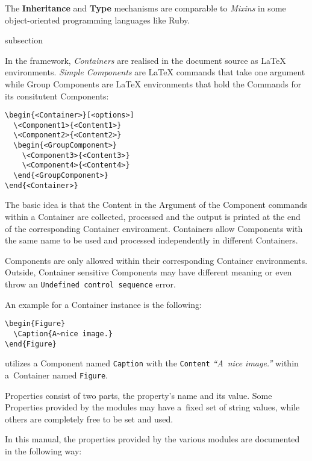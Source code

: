 The \textbf{Inheritance} and \textbf{Type} mechanisms are comparable
to \textit{Mixins} in some object-oriented programming languages like
Ruby.


\begin{Heading}{subsection}
\end{Heading}

In the {\CoCoTeX} framework, \textit{Containers} are realised in the
document source as {\LaTeX} environments. \textit{Simple Components}
are {\LaTeX} commands that take one argument while Group Components
are {\LaTeX} environments that hold the Commands for its consitutent
Components:
\begin{lstlisting}[style=tex]
\begin{<Container>}[<options>]
  \<Component1>{<Content1>}
  \<Component2>{<Content2>}
  \begin{<GroupComponent>}
    \<Component3>{<Content3>}
    \<Component4>{<Content4>}
  \end{<GroupComponent>}
\end{<Container>}
\end{lstlisting}

The basic idea is that the Content in the Argument of the
Component commands within a Container are collected,
processed and the output is printed at the end of the corresponding
Container environment. Containers allow Components with the same name
to be used and processed independently in different Containers.

Components are only allowed within their corresponding Container
environments. Outside, Container sensitive Components may have
different meaning or even throw an \texttt{Undefined control sequence}
error.

An example for a Container instance is the following:
\begin{lstlisting}[style=tex]
\begin{Figure}
  \Caption{A~nice image.}
\end{Figure}
\end{lstlisting}
utilizes a Component named \texttt{Caption} with the \texttt{Content}
\textit{“A~nice image.”} within a~Container named \texttt{Figure}.

Properties consist of two parts, the property's name and its
value. Some Properties provided by the {\CoCoTeX} modules may have
a~fixed set of string values, while others are completely free to be
set and used.

In this manual, the properties provided by the various modules are
documented in the following way:

